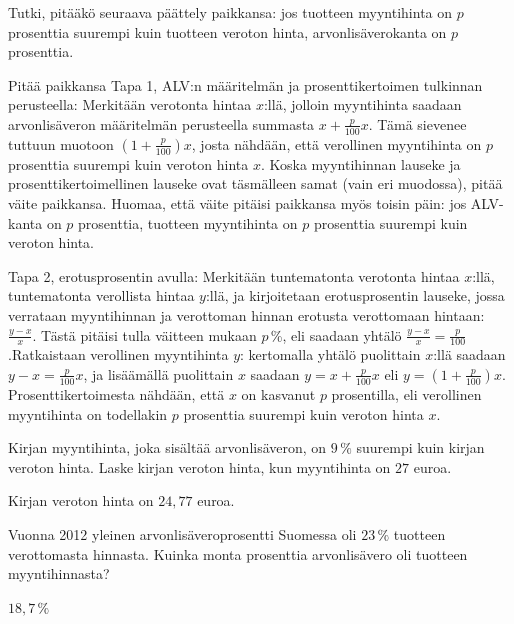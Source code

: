 \begin{tehtavasivu}
\begin{tehtava}
Tutki, pitääkö seuraava päättely paikkansa: jos tuotteen myyntihinta on $p$ prosenttia suurempi kuin tuotteen veroton hinta, arvonlisäverokanta on $p$ prosenttia.
	\begin{vastaus}
	Pitää paikkansa
	 Tapa 1, ALV:n määritelmän ja prosenttikertoimen tulkinnan perusteella: Merkitään verotonta hintaa $x$:llä, jolloin myyntihinta saadaan arvonlisäveron määritelmän perusteella summasta $x+\frac{p}{100}x$. Tämä sievenee tuttuun muotoon $(1+\frac{p}{100})x$, josta nähdään, että verollinen myyntihinta on $p$ prosenttia suurempi kuin veroton hinta $x$. Koska myyntihinnan lauseke ja prosenttikertoimellinen lauseke ovat täsmälleen samat (vain eri muodossa), pitää väite paikkansa. Huomaa, että väite pitäisi paikkansa myös toisin päin: jos ALV-kanta on $p$ prosenttia, tuotteen myyntihinta on $p$ prosenttia suurempi kuin veroton hinta.
	
	Tapa 2, erotusprosentin avulla: Merkitään tuntematonta verotonta hintaa $x$:llä, tuntematonta verollista hintaa $y$:llä, ja kirjoitetaan erotusprosentin lauseke, jossa verrataan myyntihinnan ja verottoman hinnan erotusta verottomaan hintaan: $\frac{y-x}{x}$. Tästä pitäisi tulla väitteen mukaan $p$\,\%, eli saadaan yhtälö $\frac{y-x}{x}=\frac{p}{100}$.Ratkaistaan verollinen myyntihinta $y$: kertomalla yhtälö puolittain $x$:llä saadaan $y-x=\frac{p}{100}x$, ja lisäämällä puolittain $x$ saadaan $y=x+\frac{p}{100}x$ eli $y=(1+\frac{p}{100})x$. Prosenttikertoimesta nähdään, että $x$ on kasvanut $p$ prosentilla, eli verollinen myyntihinta on todellakin $p$ prosenttia suurempi kuin veroton hinta $x$.
	\end{vastaus}
\end{tehtava}

\begin{tehtava}
     Kirjan myyntihinta, joka sisältää arvonlisäveron, on $9\,\%$ suurempi kuin kirjan veroton hinta. Laske kirjan veroton hinta, kun myyntihinta on $27$ euroa.
    \begin{vastaus}
        Kirjan veroton hinta on $24,77$ euroa.
    \end{vastaus}
\end{tehtava}

\begin{tehtava}
    Vuonna 2012 yleinen arvonlisäveroprosentti Suomessa oli $23\,\%$ tuotteen verottomasta hinnasta. Kuinka monta prosenttia arvonlisävero oli tuotteen myyntihinnasta?
    \begin{vastaus}
        $18,7\,\%$
    \end{vastaus}
\end{tehtava}


\end{tehtavasivu}
